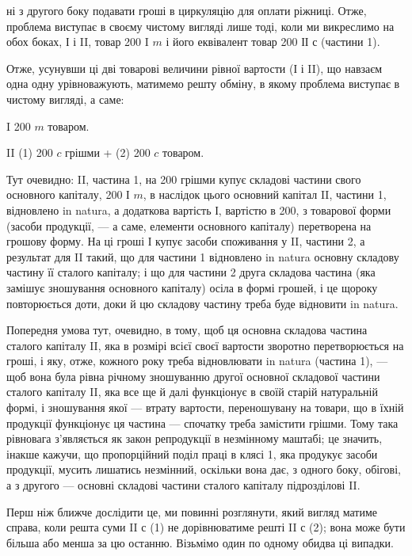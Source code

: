 \parcont{}  %
ні з другого боку подавати гроші в циркуляцію для оплати ріжниці.
Отже, проблема виступає в своєму чистому вигляді лише тоді, коли ми
викреслимо на обох боках, І і II, товар 200 I $m$ і його еквівалент товар
200 ІІ $с$ (частини 1).

Отже, усунувши ці дві товарові величини рівної вартости (І і II),
що навзаєм одна одну урівноважують, матимемо решту обміну, в якому
проблема виступає в чистому вигляді, а саме:

I 200 $m$ товаром.

II (1) 200 $c$ грішми + (2) 200 $c$ товаром.

Тут очевидно: II, частина 1, на 200 грішми купує складові частини
свого основного капіталу, 200 І $m$, в наслідок цього основний капітал II,
частини 1, відновлено in natura, а додаткова вартість І, вартістю в 200,
з товарової форми (засоби продукції, — а саме, елементи основного
капіталу) перетворена на грошову форму. На ці гроші І купує засоби
споживання у II, частини 2, а результат для II такий, що для частини 1
відновлено in natura основну складову частину її сталого капіталу; і що
для частини 2 друга складова частина (яка замішує зношування основного
капіталу) осіла в формі грошей, і це щороку повторюється доти,
доки й цю складову частину треба буде відновити in natura.

Попередня умова тут, очевидно, в тому, щоб ця основна складова частина
сталого капіталу II, яка в розмірі всієї своєї вартости зворотно перетворюється
на гроші, і яку, отже, кожного року треба відновлювати in natura
(частина 1), — щоб вона була рівна річному зношуванню другої основної
складової частини сталого капіталу II, яка все ще й далі функціонує в
своїй старій натуральній формі, і зношування якої — втрату вартости,
переношувану на товари, що в їхній продукції функціонує ця частина —
спочатку треба замістити грішми. Тому така рівновага з’являється як
закон репродукції в незмінному маштабі; це значить, інакше кажучи, що
пропорційний поділ праці в клясі 1, яка продукує засоби продукції,
мусить лишатись незмінний, оскільки вона дає, з одного боку, обігові,
а з другого — основні складові частини сталого капіталу підрозділові II.

Перш ніж ближче дослідити це, ми повинні розглянути, який вигляд
матиме справа, коли решта суми II $с$ (1) не дорівнюватиме решті II $с$
(2); вона може бути більша або менша за цю останню. Візьмімо один
по одному обидва ці випадки.

